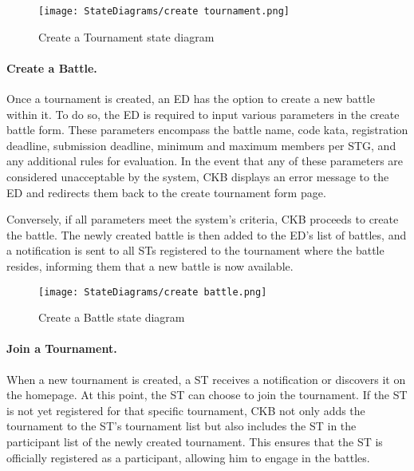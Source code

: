 \begin{figure}[H]
    \begin{center}
        \texttt{[image: StateDiagrams/create tournament.png]}
        \caption{Create a Tournament state diagram}
        \label{fig:create_tournament_sd}%
    \end{center}
\end{figure}

\paragraph{Create a Battle.}
Once a tournament is created, an ED has the option to create a new battle within it. To do so, the ED is required to input various parameters in the create battle form. These parameters encompass the battle name, code kata, registration deadline, submission deadline, minimum and maximum members per STG, and any additional rules for evaluation. In the event that any of these parameters are considered unacceptable by the system, CKB displays an error message to the ED and redirects them back to the create tournament form page.

Conversely, if all parameters meet the system's criteria, CKB proceeds to create the battle. The newly created battle is then added to the ED's list of battles, and a notification is sent to all STs registered to the tournament where the battle resides, informing them that a new battle is now available.

\begin{figure}[H]
    \begin{center}
        \texttt{[image: StateDiagrams/create battle.png]}
        \caption{Create a Battle state diagram}
        \label{fig:create_battle_sd}%
    \end{center}
\end{figure}

\paragraph{Join a Tournament.}
When a new tournament is created, a ST receives a notification or discovers it on the homepage. At this point, the ST can choose to join the tournament. If the ST is not yet registered for that specific tournament, CKB not only adds the tournament to the ST's tournament list but also includes the ST in the participant list of the newly created tournament. This ensures that the ST is officially registered as a participant, allowing him to engage in the battles.


